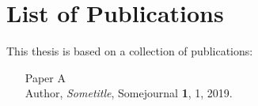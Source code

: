 \chapter{List of Publications}

This thesis is based on a collection of publications:
\begin{enumerate}

\item[\color{RoyalBlue}Paper A]\mbox{}\\ Author, \textit{Sometitle}, Somejournal \textbf{1}, 1, 2019.

\end{enumerate}
